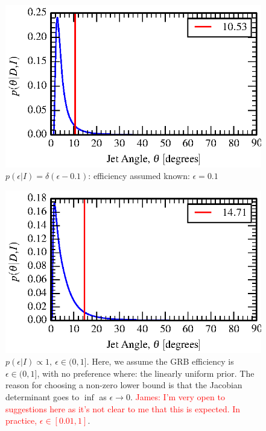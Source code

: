 \documentclass[nofootinbib]{revtex4}
\begin{document}
\begin{figure}[h!]
\includegraphics{jet_angle_posterior_s6UL_TEST_deltaEffPrior-0.1.eps}
\caption{$p(\epsilon|I)=\delta(\epsilon-0.1)$: efficiency assumed known:
$\epsilon=0.1$}
\end{figure}

\begin{figure}[h!]
\includegraphics{jet_angle_posterior_s6UL_TEST_flatEffPrior-0.01-1.eps}
\caption{$p(\epsilon|I) \propto 1,~\epsilon \in (0,1]$. 
Here, we assume the GRB efficiency is $\epsilon \in (0,1]$, with no
preference where: the linearly uniform prior.  The reason for choosing a
non-zero lower bound is that the Jacobian determinant goes to $\inf$ as
$\epsilon \rightarrow 0$.  \textcolor{red}{James: I'm very open to suggestions
here as it's not clear to me that this is expected.  In practice, $\epsilon \in
[0.01,1]$}.}
\end{figure}
\end{document}
